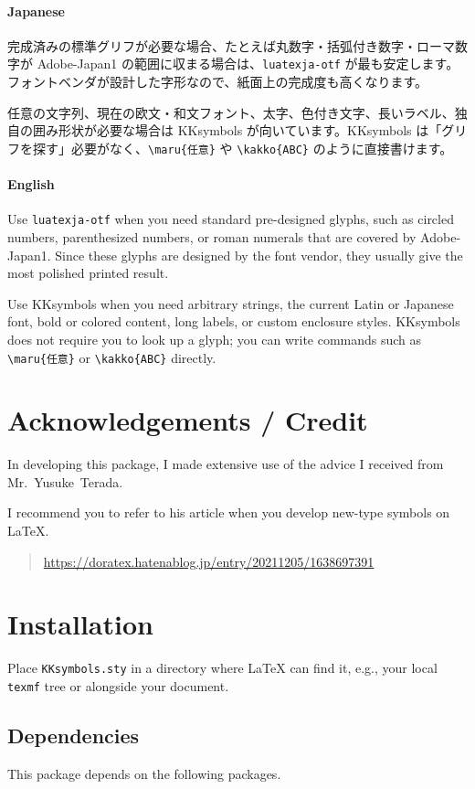 \documentclass[luatex,fontsize=8pt,paper=b5,twoside]{jlreq}%
\begin{document}
\paragraph{Japanese}
完成済みの標準グリフが必要な場合、たとえば丸数字・括弧付き数字・ローマ数字が Adobe-Japan1 の範囲に収まる場合は、\texttt{luatexja-otf} が最も安定します。フォントベンダが設計した字形なので、紙面上の完成度も高くなります。

任意の文字列、現在の欧文・和文フォント、太字、色付き文字、長いラベル、独自の囲み形状が必要な場合は KKsymbols が向いています。KKsymbols は「グリフを探す」必要がなく、\verb|\maru{任意}| や \verb|\kakko{ABC}| のように直接書けます。

\paragraph{English}
Use \texttt{luatexja-otf} when you need standard pre-designed glyphs, such as circled numbers, parenthesized numbers, or roman numerals that are covered by Adobe-Japan1. Since these glyphs are designed by the font vendor, they usually give the most polished printed result.

Use KKsymbols when you need arbitrary strings, the current Latin or Japanese font, bold or colored content, long labels, or custom enclosure styles. KKsymbols does not require you to look up a glyph; you can write commands such as \verb|\maru{任意}| or \verb|\kakko{ABC}| directly.


\section{Acknowledgements / Credit}
In developing this package, I made extensive use of the advice I received from Mr.~Yusuke~Terada.

I recommend you to refer to his article when you develop new-type symbols on \LaTeX.

\begin{quotation}
  \url{https://doratex.hatenablog.jp/entry/20211205/1638697391}
\end{quotation}

\section{Installation}
Place \texttt{KKsymbols.sty} in a directory where LaTeX can find it, e.g., your local \texttt{texmf} tree or alongside your document.

\subsection{Dependencies}
This package depends on the following packages.
\end{document}
